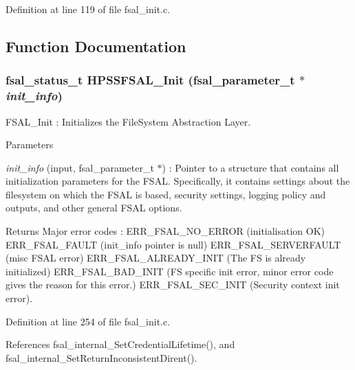 Definition at line 119 of file fsal\_\-init.c.

\subsection{Function Documentation}
\subsubsection[{HPSSFSAL\_\-Init}]{\setlength{\rightskip}{0pt plus 5cm}fsal\_\-status\_\-t HPSSFSAL\_\-Init (fsal\_\-parameter\_\-t $\ast$ {\em init\_\-info})}\label{fsal__init_8c_a40e78ed47f8aee6bd33536a3dbe6c495}
FSAL\_\-Init : Initializes the FileSystem Abstraction Layer.


\begin{DoxyParams}{Parameters}
\item[{\em init\_\-info}](input, fsal\_\-parameter\_\-t $\ast$) : Pointer to a structure that contains all initialization parameters for the FSAL. Specifically, it contains settings about the filesystem on which the FSAL is based, security settings, logging policy and outputs, and other general FSAL options.\end{DoxyParams}
\begin{DoxyReturn}{Returns}
Major error codes : ERR\_\-FSAL\_\-NO\_\-ERROR (initialisation OK) ERR\_\-FSAL\_\-FAULT (init\_\-info pointer is null) ERR\_\-FSAL\_\-SERVERFAULT (misc FSAL error) ERR\_\-FSAL\_\-ALREADY\_\-INIT (The FS is already initialized) ERR\_\-FSAL\_\-BAD\_\-INIT (FS specific init error, minor error code gives the reason for this error.) ERR\_\-FSAL\_\-SEC\_\-INIT (Security context init error). 
\end{DoxyReturn}


Definition at line 254 of file fsal\_\-init.c.

References fsal\_\-internal\_\-SetCredentialLifetime(), and fsal\_\-internal\_\-SetReturnInconsistentDirent().